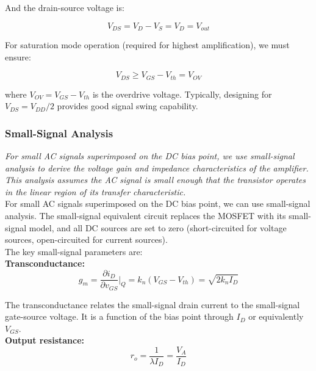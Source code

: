 \documentclass[10pt]{article}
\begin{document}
And the drain-source voltage is:

\begin{equation}
    V_{DS} = V_D - V_S = V_D = V_{out}
    \label{eq:vds}
\end{equation}

For saturation mode operation (required for highest amplification), we must ensure: 

\begin{equation}
    V_{DS} \geq V_{GS} - V_{th} = V_{OV}
    \label{eq:sat_condition}
\end{equation}

where $V_{OV} = V_{GS} - V_{th}$ is the overdrive voltage.  Typically, designing for $V_{DS} = V_{DD}/2$ provides good signal swing capability.

\subsubsection{Small-Signal Analysis}

\textit{For small AC signals superimposed on the DC bias point, we use small-signal analysis to derive the voltage gain and impedance characteristics of the amplifier. This analysis assumes the AC signal is small enough that the transistor operates in the linear region of its transfer characteristic.} \\

For small AC signals superimposed on the DC bias point, we can use small-signal analysis. The small-signal equivalent circuit replaces the MOSFET with its small-signal model, and all DC sources are set to zero (short-circuited for voltage sources, open-circuited for current sources).\\

The key small-signal parameters are: \\

\textbf{Transconductance: }
\begin{equation}
    g_m = \frac{\partial i_D}{\partial v_{GS}}\bigg|_{Q} = k_n (V_{GS} - V_{th}) = \sqrt{2 k_n I_D}
    \label{eq:gm}
\end{equation}

The transconductance relates the small-signal drain current to the small-signal gate-source voltage.  It is a function of the bias point through $I_D$ or equivalently $V_{GS}$. \\

\textbf{Output resistance:}
\begin{equation}
    r_o = \frac{1}{\lambda I_D} = \frac{V_A}{I_D}
    \label{eq:ro}
\end{equation}
\end{document}
